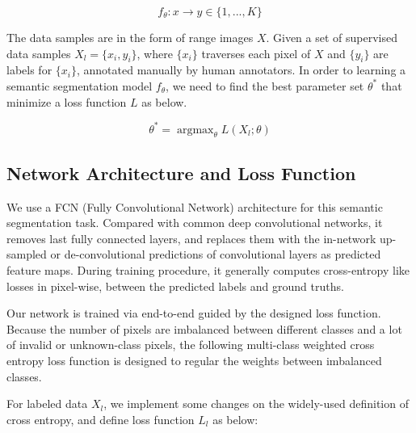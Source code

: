 \begin{equation}
f_{\theta}: x\to y \in \{1,...,K\}
\end{equation}

The data samples are in the form of range images $X$. Given a set of supervised data samples $X_l=\{x_i, y_i\}$, where $\{x_i\}$ traverses each pixel of $X$ and $\{y_i\}$ are labels for $\{x_i\}$, annotated manually by human annotators. 
In order to learning a semantic segmentation model $f_\theta$, we need to find the best parameter set $\theta^*$ that minimize a loss function $L$ as below.

\begin{equation}
\theta^{*}=\mathop{\arg\max}_{\theta}L(X_l; \theta)
\end{equation}

\subsection{Network Architecture and Loss Function}
We use a FCN (Fully Convolutional Network) architecture for this semantic segmentation task.
Compared with common deep convolutional networks, it removes last fully connected layers, and replaces them with the in-network up-sampled or de-convolutional predictions of convolutional layers as predicted feature maps. During training procedure, it generally computes cross-entropy like losses in pixel-wise, between the predicted labels and ground truths.

Our network is trained via end-to-end guided by the designed loss function. Because the number of pixels are imbalanced between different classes and a lot of invalid or unknown-class pixels, the following multi-class weighted cross entropy loss function is designed to regular the weights between imbalanced classes.

For labeled data $X_l$, we implement some changes on the widely-used definition of cross entropy, and define loss function $L_l$ as below:

